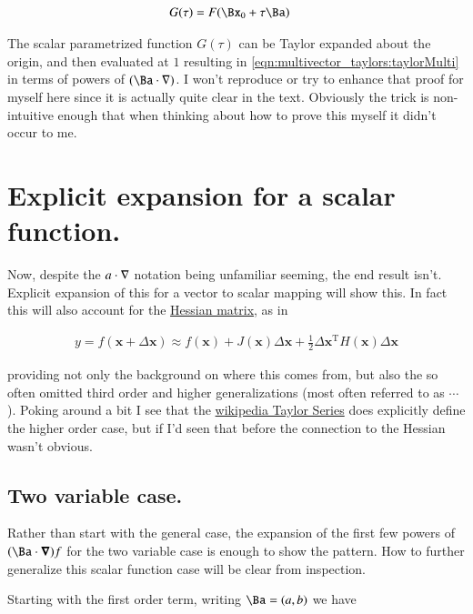 \begin{align}
G(\tau) &= F(\Bx_0 + \tau\Ba)
\end{align}

The scalar parametrized function $G(\tau)$ can be Taylor expanded about
the origin, and then evaluated at $1$ resulting in 
\ref{eqn:multivector_taylors:taylorMulti} in terms of powers of $(\Ba \cdot \grad)$.  
I won't reproduce or try to
enhance that proof for myself here since it is actually 
quite clear in the text.  Obviously the trick is non-intuitive enough
that when thinking about how to prove this myself it didn't occur to me.

\section{Explicit expansion for a scalar function. }

Now, despite the $a \cdot \nabla$ notation being unfamiliar seeming, the 
end result isn't.  Explicit expansion of this for a vector to scalar mapping
will show this.  In fact this will also account for the 
\href{http://en.wikipedia.org/wiki/Hessian_matrix}{Hessian matrix}, as in

\begin{align*}
y=f(\mathbf{x}+\Delta\mathbf{x})\approx f(\mathbf{x}) + J(\mathbf{x})\Delta \mathbf{x} +\frac{1}{2} \Delta\mathbf{x}^\mathrm{T} H(\mathbf{x}) \Delta\mathbf{x}
\end{align*}

providing
not only the background on where this comes from, but also the so often
omitted third order and higher generalizations (most often referred to as $\cdots$).  Poking around a bit I see that the \href{http://en.wikipedia.org/wiki/Taylor_expansion}{wikipedia Taylor Series} does explicitly define the higher order case, but if 
I'd seen that before the connection to the Hessian wasn't obvious.

\subsection{Two variable case. }

Rather than start with the general case, the expansion of the first few powers
of $(\Ba \cdot \spacegrad) f$ for the two variable case is enough to show the pattern.
How to further generalize this scalar function case will be clear from 
inspection.

Starting with the first order term, writing $\Ba = (a,b)$ we have

